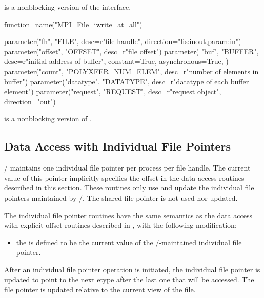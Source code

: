  is a nonblocking version
of the  interface.

%
%
%
\begin{mpi-binding}
    function_name("MPI_File_iwrite_at_all")
    
    parameter("fh", "FILE", desc=r"file handle", direction="lis:inout,param:in")
    parameter("offset", "OFFSET", desc=r"file offset")
    parameter(
        "buf",
        "BUFFER",
        desc=r"initial address of buffer",
        constant=True,
        asynchronous=True,
    )
    parameter("count", "POLYXFER_NUM_ELEM", desc=r"number of elements in buffer")
    parameter("datatype", "DATATYPE", desc=r"datatype of each buffer element")
    parameter("request", "REQUEST", desc=r"request object", direction="out")
\end{mpi-binding}

 is a nonblocking version of
.

\subsection{Data Access with Individual File Pointers}
\label{sec:io-indiv-ptr}

\MPI/ maintains one individual file pointer
per process per
file handle.
The current value of this pointer implicitly specifies
the offset in the data access routines described in this section.
These routines only use and update the individual file pointers
maintained by \MPI/.
The shared file pointer is not used nor updated.

The individual file pointer routines
have the same semantics as the data access with explicit offset routines
described in ,
with the following modification:
\begin{itemize}
\item the  is defined to be the current value
        of the \MPI/-maintained individual file pointer.
\end{itemize}
After an individual file pointer operation is initiated,
the individual file pointer is updated to point
to the next etype after the last one 
that will be accessed.
The file pointer is updated relative to the current view of the file.


